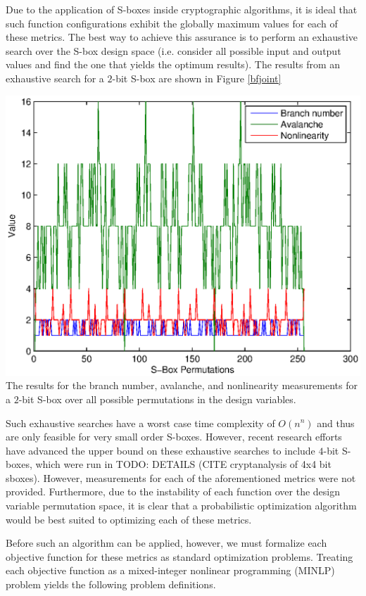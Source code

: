 \documentclass[11pt]{article}
\begin{document}
Due to the application of S-boxes inside cryptographic algorithms, it is ideal that such function configurations exhibit the globally maximum values for each of these metrics. The best way to achieve this assurance is to perform an exhaustive search over the S-box design space (i.e. consider all possible input and output values and find the one that yields the optimum results). The results from an exhaustive search for a $2$-bit S-box are shown in Figure \ref{bfjoint}

\begin{center}
	\includegraphics[scale=0.75]{images/brute_joint.eps} \\
	\label{bfjoint}
The results for the branch number, avalanche, and nonlinearity measurements for a $2$-bit S-box over all possible permutations in the design variables. 
\end{center}

Such exhaustive searches have a worst case time complexity of $O(n^n)$ and thus are only feasible for very small order S-boxes. However, recent research efforts have advanced the upper bound on these exhaustive searches to include $4$-bit S-boxes, which were run in TODO: DETAILS (CITE cryptanalysis of 4x4 bit sboxes). However, measurements for each of the aforementioned metrics were not provided. Furthermore, due to the instability of each function over the design variable permutation space, it is clear that a probabilistic optimization algorithm would be best suited to optimizing each of these metrics. 

Before such an algorithm can be applied, however, we must formalize each objective function for these metrics as standard optimization problems. Treating each objective function as a mixed-integer nonlinear programming (MINLP) problem yields the following problem definitions. \\
\end{document}
